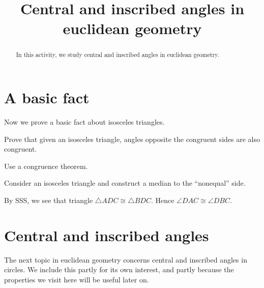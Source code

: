 \documentclass{ximera}
\title{Central and inscribed angles in euclidean geometry}
\begin{document}
\begin{abstract}
In this activity, we study central and inscribed angles in euclidean
geometry.
\end{abstract}
\maketitle

\section{A basic fact}
Now we prove a basic fact about isosceles triangles.


\begin{problem}
Prove that given an isosceles triangle, angles opposite the congruent
sides are also congruent.
\begin{hint}
Use a congruence theorem.
\end{hint}
\begin{freeResponse}
Consider an isosceles triangle and construct a median to the
``nonequal'' side.
\begin{image}
\end{image}
By SSS, we see that triangle $\triangle ADC \cong \triangle
BDC$. Hence $\angle DAC \cong \angle DBC$.
\end{freeResponse}
\end{problem}


\section{Central and inscribed angles}

The next topic in euclidean geometry concerns central and inscribed
angles in circles. We include this partly for its own interest, and
partly because the properties we visit here will be useful later on.
\end{document}
